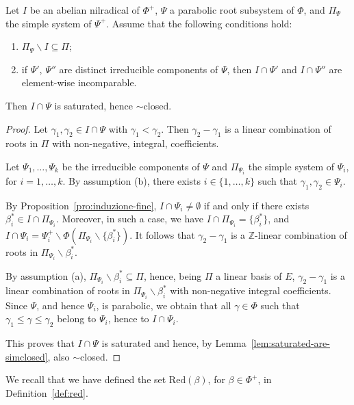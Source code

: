 \documentclass[ALCO,published]{cedram}
\theoremstyle{plain}
\newcommand\smeno{\smallsetminus}
\newcommand\ganz{\mathbb Z}
\newcommand\be{\beta}
\newcommand\ga{\gamma}
\newcommand\red{\mathrm{Red}}
\renewcommand{\leq}{\leqslant}
\begin{document}
\begin{lem}\label{lem:simclosed-suff-cond}
Let $I$ be an abelian nilradical of $\Phi^+$, $\Psi$ a parabolic root subsystem of $\Phi$, and $\Pi_\Psi$ the simple system of $\Psi^+$.
Assume that the following conditions hold:  
\begin{enumerate}[label=\textup{(\alph*)}]
\item $\Pi_\Psi\smeno I\subseteq \Pi$; 
\item if $\Psi'$, $\Psi''$ are distinct irreducible components of $\Psi$, then $I\cap\Psi'$ and  $I\cap \Psi''$ are element-wise incomparable.
\end{enumerate} 
Then $I\cap \Psi$ is saturated,  hence $\sim$closed. 
\end{lem}

\begin{proof}
Let $\ga_1, \ga_2\in I\cap \Psi$ with $\ga_1< \ga_2$.
Then   $\ga_2-\ga_1$ is a linear combination of roots in $\Pi$ with non-negative, integral, coefficients. 

\par
Let $\Psi_1, \dots, \Psi_k$ be the irreducible components of $\Psi$ and $\Pi_{\Psi_i}$ the simple system of $\Psi_i$, for $i=1, \dots, k$. 
By assumption (b), there exists $i\in \{1, \dots, k\}$ such that $\ga_1, \ga_2\in \Psi_i$. 

\par
By Proposition~\ref{pro:induzione-fine}, $I\cap \Psi_i\neq\emptyset$ if and only if there exists $\be_i^*\in I\cap \Pi_{\Psi_i}$. 
Moreover, in such a case, we have $I\cap \Pi_{\Psi_i}=\{\be_i^*\}$, and $I\cap \Psi_i=\Psi_i^+\smeno\Phi(\Pi_{\Psi_i}\smeno\{\be_i^*\})$.
It follows that $\ga_2-\ga_1$ is a $\ganz$-linear combination of roots in $\Pi_{\Psi_i}\smeno {\be_i^*}$. 

\par
By assumption (a), $\Pi_{\Psi_i}\smeno {\be_i^*}\subseteq \Pi$, hence, being $\Pi$ a linear basis of $E$, $\ga_2-\ga_1$ is a linear combination of roots in $\Pi_{\Psi_i}\smeno {\be_i^*}$ with non-negative integral coefficients. 
Since $\Psi$, and hence $\Psi_i$, is parabolic, we obtain that all $\ga\in \Phi$ such that $\ga_1\leq \ga\leq \ga_2$ belong to $\Psi_i$, hence to  $I\cap\Psi_i$. 

\par
This proves that $I\cap \Psi$ is saturated and hence, 
by Lemma~\ref{lem:saturated-are-simclosed}, also $\sim$closed.
\end{proof}

We recall that we have defined the set $\red(\be)$, for  $\be\in \Phi^+$,  in  Definition~\ref{def:red}.
\end{document}
